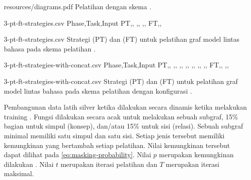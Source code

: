   {resources/diagrams.pdf}
  {Pelatihan dengan skema .}

\begin{filecontents*}{3-pt-ft-strategies.csv}
Phase,Task,Input
PT,,\makecell[cl]{\sTagged{[mask]}\graphMasked{}}
,,
,,
FT,,
\end{filecontents*}
  {3-pt-ft-strategies.csv}
  {Strategi \pretraining{} (PT) dan \finetuning{} (FT) untuk pelatihan graf model \amrparsing{} lintas bahasa pada skema pelatihan .}

\begin{filecontents*}{3-pt-ft-strategies-with-concat.csv}
Phase,Task,Input
PT,,\makecell[cl]{\idTagged{[mask]}\enTagged{[mask]}\graphMasked{}}
,,
,,
,,
,,
,,
,,
FT,,
,,
\end{filecontents*}
  {3-pt-ft-strategies-with-concat.csv}
  {Strategi \pretraining{} (PT) dan \finetuning{} (FT) untuk pelatihan graf model \amrparsing{} lintas bahasa pada skema pelatihan  dengan konfigurasi .}

Pembangunan data latih silver ketika \pretraining{} dilakukan  secara dinamis ketika melakukan training .
Fungsi  dilakukan secara acak untuk melakukan  sebuah subgraf, 15\% bagian untuk  simpul (konsep), dan/atau 15\% untuk  sisi (relasi).
Sebuah subgraf minimal memiliki satu simpul dan satu sisi.
Setiap jenis  tersebut memiliki kemungkinan yang bertambah setiap  pelatihan.
Nilai kemungkinan tersebut dapat dilihat pada \cref{eq:masking-probability}.
Nilai $p$ merupakan kemungkinan dilakukan .
Nilai $t$ merupakan iterasi pelatihan dan $T$ merupakan iterasi maksimal.

